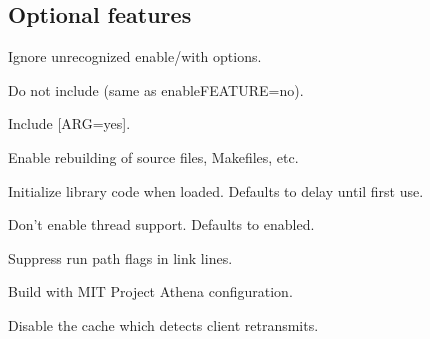 \documentclass[letterpaper,10pt,english]{sphinxmanual}
\begin{document}
\subsection{Optional features}
\label{\detokenize{build/options2configure:optional-features}}\begin{description}
\sphinxAtStartPar
Ignore unrecognized \textendash{}enable/\textendash{}with options.

\sphinxAtStartPar
Do not include  (same as \textendash{}enable\sphinxhyphen{}FEATURE=no).

\sphinxAtStartPar
Include  {[}ARG=yes{]}.

\sphinxAtStartPar
Enable rebuilding of source files, Makefiles, etc.

\sphinxAtStartPar
Initialize library code when loaded.  Defaults to delay until
first use.

\sphinxAtStartPar
Don’t enable thread support.  Defaults to enabled.

\sphinxAtStartPar
Suppress run path flags in link lines.

\sphinxAtStartPar
Build with MIT Project Athena configuration.

\sphinxAtStartPar
Disable the cache which detects client retransmits.


\end{description}
\end{document}
